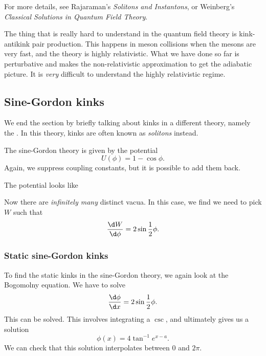 \documentclass[a4paper]{article}
\begin{document}
For more details, see Rajaraman's \emph{Solitons and Instantons}, or Weinberg's \emph{Classical Solutions in Quantum Field Theory}.

The thing that is really hard to understand in the quantum field theory is kink-antikink pair production. This happens in meson collisions when the mesons are very fast, and the theory is highly relativistic. What we have done so far is perturbative and makes the non-relativistic approximation to get the adiabatic picture. It is \emph{very} difficult to understand the highly relativistic regime.

\subsection{Sine-Gordon kinks}
We end the section by briefly talking about kinks in a different theory, namely the . In this theory, kinks are often known as \emph{solitons} instead.

The sine-Gordon theory is given by the potential
\[
  U(\phi) = 1 - \cos \phi.
\]
Again, we suppress coupling constants, but it is possible to add them back.

The potential looks like
\begin{center}
\end{center}
Now there are \emph{infinitely many} distinct vacua. In this case, we find we need to pick $W$ such that
\[
  \frac{\d W}{\d \phi} = 2 \sin \frac{1}{2}\phi.
\]

\subsubsection*{Static sine-Gordon kinks}
To find the static kinks in the sine-Gordon theory, we again look at the Bogomolny equation. We have to solve
\[
  \frac{\d \phi}{\d x} = 2 \sin \frac{1}{2}\phi.
\]
This can be solved. This involves integrating a $\csc$, and ultimately gives us a solution
\[
  \phi(x) = 4 \tan^{-1} e^{x - a}.
\]
We can check that this solution interpolates between $0$ and $2\pi$.
\end{document}
